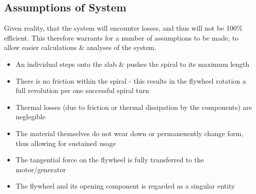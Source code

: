 \documentclass[conference]{IEEEtran}
\begin{document}


\subsection{Assumptions of System}
Given reality, that the system will encounter losses, and thus will not be 100\% efficient. This therefore warrants for a number of assumptions to be made, to allow easier calculations \& analyses of the system.
\begin{itemize}
    \item An individual steps onto the slab \& pushes the spiral to its maximum length
    \item There is no friction within the spiral - this results in the flywheel rotation a full revolution per one successful spiral turn
    \item Thermal losses (due to friction or thermal dissipation by the components) are neglegible
    \item The material themselves do not wear down or permanenently change form, thus allowing for sustained usage
    \item The tangential force on the flywheel is fully transferred to the motor/generator
    \item The flywheel and its opening component is regarded as a singular entity
\end{itemize}
\end{document}
